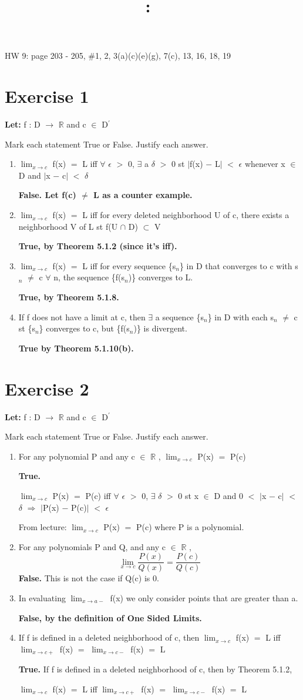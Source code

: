 \documentclass{article}
\title{
    \vspace{2in}
    \textmd{\textbf{\hmwkClass:\ \hmwkTitle}}\\
    \normalsize\vspace{0.1in}\small\vspace{0.1in}\large{\textit{\hmwkClassInstructor}}
    \vspace{3in}
}
\author{\hmwkAuthorName}
\date{}
\newcommand{\mt}[1]{\ensuremath{#1}}
\newcommand\bsc[2][\DefaultOpt]{%
  \def\DefaultOpt{#2}%
  \section[#1]{#2}%
}
\newcommand{\balist}{\begin{enumerate}[label=\alph*.]}
\newcommand{\elist}{\end{enumerate}}
\newcommand{\lt}[1]{\textbf{Let: } #1}
\newcommand{\br}{\mt{\mathbb{R}} }       %
\newcommand{\ep}{\mt{\epsilon} }         %
\newcommand{\fa}{\mt{\forall} }          %
\newcommand{\dta}{\mt{\delta} }
\newcommand{\mem}{\mt{\in} }
\newcommand{\exs}{\mt{\exists} }
\newcommand{\sbs}{\mt{\subset} }         %
\newcommand{\lra}{ \mt{\longrightarrow} } %
\newcommand{\rar}{ \mt{\Rightarrow} }     %
\newcommand{\av}[1]{\mt{|}#1\mt{|}}  %
\newcommand{\bk}[1]{\{#1\}}
\newcommand{\ms}{\mt{-} }
\newcommand{\ls}{\mt{<} }
\newcommand{\gr}{\mt{>} }
\newcommand{\eql}{\mt{=} }
\newcommand{\pr}{\mt{^\prime} } 		   %
\newcommand{\uw}[2]{#1\mt{_{#2}}}
\newcommand{\limt}[2]{\mt{\displaystyle{\lim_{#1 \to #2}}}}
\newcommand{\eqn}[1]{\[#1\]}
\newcommand{\inn}{\mt{\cap} }
\begin{document}
HW 9: page 203 - 205, \#1, 2, 3(a)(c)(e)(g), 7(c), 13, 16, 18, 19
\bsc{Exercise 1}{

\lt{f : D \lra \br and c \mem D\pr}

Mark each statement True or False. Justify each answer.

\balist
\item \limt{x}{c} f(x) \eql L iff \fa \ep \gr 0, \exs a \dta \gr 0 st \av{f(x) \ms L} \ls \ep whenever x \mem D and \av{x \ms c} \ls \dta
	
	\textbf{False. Let f(c) $\neq$ L as a counter example.}
\item \limt{x}{c} f(x) \eql L iff for every deleted neighborhood U of c, there exists a neighborhood V of L st f(U \inn D) \sbs V

	\textbf{True, by Theorem 5.1.2 (since it's iff).}

\item \limt{x}{c} f(x) \eql L iff for every sequence \bk{\uw{s}{n}} in D that converges to c with \uw{s}{n} $\neq$ c \fa n, the sequence \bk{f(\uw{s}{n})} converges to L.
	
	\textbf{True, by Theorem 5.1.8.}
\item If f does not have a limit at c, then \exs a sequence \bk{\uw{s}{n}} in D with each \uw{s}{n} $\neq$ c st \bk{\uw{s}{n}} converges to c, but \bk{f(\uw{s}{n})} is divergent.
	
	\textbf{True by Theorem 5.1.10(b).}
\elist

}

\bsc{Exercise 2}{

\lt{f : D \lra \br and c \mem D\pr}

Mark each statement True or False. Justify each answer.

\balist
\item For any polynomial P and any c \mem \br, \limt{x}{c} P(x) \eql P(c)

	\textbf{True.}
	
	\limt{x}{c} P(x) \eql P(c) iff \fa \ep \gr 0, \exs \dta \gr 0 st x \mem D and 0 \ls \av{x \ms c} \ls \dta \rar \av{P(x) \ms P(c)} \ls \ep
	
	From lecture: \limt{x}{c} P(x) \eql P(c) where P is a polynomial.

\item For any polynomials P and Q, and any c \mem \br,
	\eqn{\limt{x}{c} \frac{P(x)}{Q(x)} = \frac{P(c)}{Q(c)}}
	\textbf{False.} This is not the case if Q(c) is 0.
	
\item In evaluating \limt{x}{a-} f(x) we only consider points that are greater than a.
	
	\textbf{False, by the definition of One Sided Limits.}
\item If f is defined in a deleted neighborhood of c, then \limt{x}{c} f(x) \eql L iff \limt{x}{c+} f(x) \eql \limt{x}{c-} f(x) \eql L
	
	\textbf{True.} If f is defined in a deleted neighborhood of c, then by Theorem 5.1.2,
	
	\limt{x}{c} f(x) \eql L iff \limt{x}{c+} f(x) \eql \limt{x}{c-} f(x) \eql L
	
\elist

}
\end{document}

